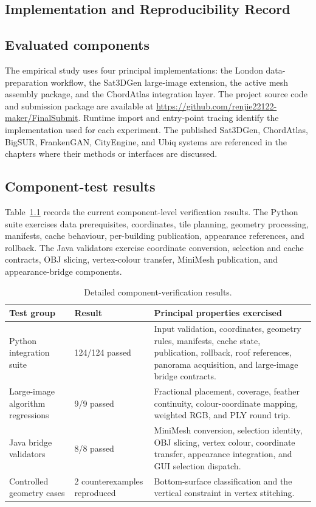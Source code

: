 \documentclass[12pt, a4paper]{report}
\begin{document}
\begin{appendices}
\chapter{Implementation and Reproducibility Record}\label{app:evidence-record}

\section{Evaluated components}

The empirical study uses four principal implementations: the London
data-preparation workflow, the Sat3DGen large-image extension, the active mesh
assembly package, and the ChordAtlas integration layer.
The project source code and submission package are available at
\url{https://github.com/renjie22122-maker/FinalSubmit}.
Runtime import and entry-point tracing identify the implementation used for
each experiment.  The published Sat3DGen,
ChordAtlas, BigSUR, FrankenGAN, CityEngine, and Ubiq systems are referenced in
the chapters where their methods or interfaces are discussed.

\section{Component-test results}

Table~\ref{tab:appendix-component-tests} records the current component-level
verification results.  The Python suite exercises data prerequisites,
coordinates, tile planning, geometry processing, manifests, cache behaviour,
per-building publication, appearance references, and rollback.  The Java
validators exercise coordinate conversion, selection and cache contracts, OBJ
slicing, vertex-colour transfer, MiniMesh publication, and appearance-bridge
components.

\begin{table}[H]
\centering
\caption{Detailed component-verification results.}
\label{tab:appendix-component-tests}
\small
\begin{tabularx}{\textwidth}{p{}p{}X}
\toprule
Test group & Result & Principal properties exercised\\
\midrule
Python integration suite & 124/124 passed & Input validation, coordinates,
geometry rules, manifests, cache state, publication, rollback, roof references,
panorama acquisition, and large-image bridge contracts.\\
Large-image algorithm regressions & 9/9 passed & Fractional placement,
coverage, feather continuity, colour-coordinate mapping, weighted RGB, and PLY
round trip.\\
Java bridge validators & 8/8 passed & MiniMesh conversion, selection identity,
OBJ slicing, vertex colour, coordinate transfer, appearance integration, and
GUI selection dispatch.\\
Controlled geometry cases & 2 counterexamples reproduced & Bottom-surface
classification and the vertical constraint in vertex stitching.\\
\bottomrule
\end{tabularx}
\end{table}


\end{appendices}
\end{document}
